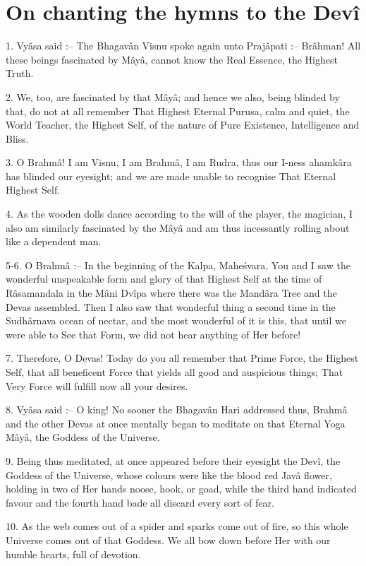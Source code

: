 ﻿\chapter{On chanting the hymns to the Dev\^i}

1. Vy\^asa said :-- The Bhagav\^an Visnu spoke again unto Praj\^apati :-- Br\^ahman! All these beings fascinated by M\^ay\^a, cannot know the Real Essence, the Highest Truth.

2. We, too, are fascinated by that M\^ay\^a; and hence we also, being blinded by that, do not at all remember That Highest Eternal Purusa, calm and quiet, the World Teacher, the Highest Self, of the nature of Pure Existence, Intelligence and Bliss.

3. O Brahm\^a! I am Visnu, I am Brahm\^a, I am Rudra, thus our I-ness ahamk\^ara has blinded our eyesight; and we are made unable to recognise That Eternal Highest Self.

4. As the wooden dolls dance according to the will of the player, the magician, I also am similarly fascinated by the M\^ay\^a and am thus incessantly rolling about like a dependent man.

5-6. O Brahm\^a :-- In the beginning of the Kalpa, Mahe\'svara, You and I saw the wonderful unspeakable form and glory of that Highest Self at the time of R\^asamandala in the M\^ani Dv\^ipa where there was the Mand\^ara Tree and the Devas assembled. Then I also saw that wonderful thing a second time in the Sudh\^arnava ocean of nectar, and the most wonderful of it is this, that until we were able to See that Form, we did not hear anything of Her before!

7. Therefore, O Devas! Today do you all remember that Prime Force, the Highest Self, that all beneficent Force that yields all good and auspicious things; That Very Force will fulfill now all your desires.

8. Vy\^asa said :-- O king! No sooner the Bhagav\^an Hari addressed thus, Brahm\^a and the other Devas at once mentally began to meditate on that Eternal Yoga M\^ay\^a, the Goddess of the Universe.

9. Being thus meditated, at once appeared before their eyesight the Dev\^i, the Goddess of the Universe, whose colours were like the blood red Jav\^a flower, holding in two of Her hands noose, hook, or goad, while the third hand indicated favour and the fourth hand bade all discard every sort of fear.

10. As the web comes out of a spider and sparks come out of fire, so this whole Universe comes out of that Goddess. We all bow down before Her with our humble hearts, full of devotion.

